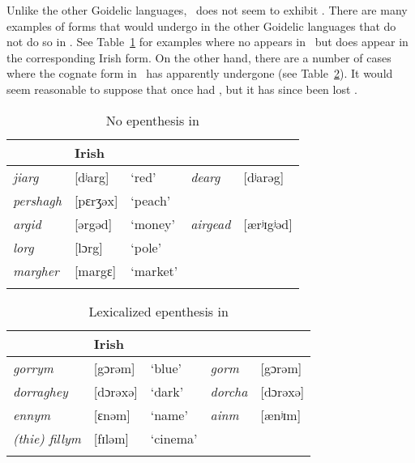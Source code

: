 \documentclass[output=paper,colorlinks,citecolor=brown]{langscibook}
\begin{document}
Unlike the other Goidelic languages, \ma\ does not seem to exhibit . There are many examples of forms that would undergo  in the other Goidelic languages that do not do so in \ma. See Table~\ref{ma.noepenthesis.tab} for examples where no  appears in \ma\ but does appear in the corresponding Irish form. On the other hand, there are a number of cases where the cognate form in \ma\ has apparently undergone  (see Table~\ref{ma.epenthesis.tab}). It would seem reasonable to suppose that \mhhl{\ma} once had , but it has since been lost .


\begin{table}
\caption{No epenthesis in \ma}
\label{ma.noepenthesis.tab}
\begin{tabular}[t]{lllll}
\lsptoprule
\multicolumn{3}{l}{\ma}   & \multicolumn{2}{l}{Irish}   \\
\midrule
\itshape jiarg        & [dʲarg]    & `red'     & \itshape dearg & [dʲarəg] \\
\itshape pershagh     & [pɛrʒəx]   & `peach'    \\
\itshape argid        & [ərgəd]    & `money'   & \itshape airgead & [ærʲɪgʲəd] \\
\itshape lorg         & [lɔrg]     & `pole'     \\
\itshape margher      & [margɛ]    & `market'   \\
\lspbottomrule
\end{tabular}
\end{table}

\begin{table}
\caption{Lexicalized epenthesis in \ma}
\label{ma.epenthesis.tab}
\begin{tabular}[t]{lllll}
\lsptoprule
\multicolumn{3}{l}{\ma}   & \multicolumn{2}{l}{Irish} \\
\midrule
\itshape gorrym        & [gɔrəm]   & `blue'     & \itshape gorm     & [gɔrəm]  \\
\itshape dorraghey     & [dɔrəxə]  & `dark'     & \itshape dorcha   & [dɔrəxə] \\
\itshape ennym         & [ɛnəm]    & `name'     & \itshape ainm     & [ænʲɪm] \\
\itshape (thie) fillym & [fɪləm]   & `cinema'   & \itshape          &  \\
\lspbottomrule
\end{tabular}
\end{table}
\end{document}
